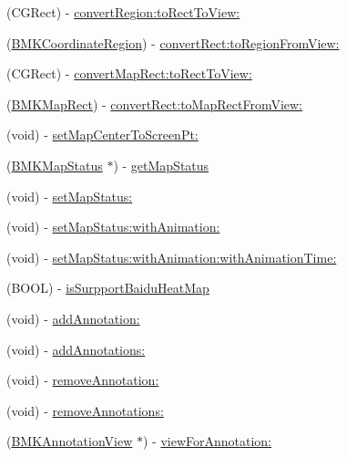 \begin{DoxyCompactItemize}
\item 
(C\+G\+Rect) -\/ \hyperlink{interface_b_m_k_map_view_a952023c2e24a13c993977d276745f329}{convert\+Region\+:to\+Rect\+To\+View\+:}
\item 
(\hyperlink{struct_b_m_k_coordinate_region}{B\+M\+K\+Coordinate\+Region}) -\/ \hyperlink{interface_b_m_k_map_view_ae99130c0eceabae6c9e202699ba375d1}{convert\+Rect\+:to\+Region\+From\+View\+:}
\item 
(C\+G\+Rect) -\/ \hyperlink{interface_b_m_k_map_view_a4a802244887690c7238bd5c8e18918ae}{convert\+Map\+Rect\+:to\+Rect\+To\+View\+:}
\item 
(\hyperlink{struct_b_m_k_map_rect}{B\+M\+K\+Map\+Rect}) -\/ \hyperlink{interface_b_m_k_map_view_afa77dab84c13620c4ce0dee46df87b46}{convert\+Rect\+:to\+Map\+Rect\+From\+View\+:}
\item 
(void) -\/ \hyperlink{interface_b_m_k_map_view_afc552204ea098d293a4f0d7ebf35b8ac}{set\+Map\+Center\+To\+Screen\+Pt\+:}
\item 
(\hyperlink{interface_b_m_k_map_status}{B\+M\+K\+Map\+Status} $\ast$) -\/ \hyperlink{interface_b_m_k_map_view_a419f8ac73742ccf9ef7fb921b349bca4}{get\+Map\+Status}
\item 
(void) -\/ \hyperlink{interface_b_m_k_map_view_a595b3baaa42f35fd5fa3b778011a59d7}{set\+Map\+Status\+:}
\item 
(void) -\/ \hyperlink{interface_b_m_k_map_view_abf8e2308ae62e367f8b1271a9918060f}{set\+Map\+Status\+:with\+Animation\+:}
\item 
(void) -\/ \hyperlink{interface_b_m_k_map_view_a9668d8aa419c7a9140c79846fabc3598}{set\+Map\+Status\+:with\+Animation\+:with\+Animation\+Time\+:}
\item 
(B\+O\+O\+L) -\/ \hyperlink{interface_b_m_k_map_view_a2256a65857b14f9cd56655663a966e14}{is\+Surpport\+Baidu\+Heat\+Map}
\item 
(void) -\/ \hyperlink{interface_b_m_k_map_view_a2af9ed45c3a7fd530dd414dc573327b3}{add\+Annotation\+:}
\item 
(void) -\/ \hyperlink{interface_b_m_k_map_view_affd032313c55ae27814430b760e4aea0}{add\+Annotations\+:}
\item 
(void) -\/ \hyperlink{interface_b_m_k_map_view_a6b6b75a5bf8b02854767f782a38d2009}{remove\+Annotation\+:}
\item 
(void) -\/ \hyperlink{interface_b_m_k_map_view_a37fbe2b5db750affb4e0234cbf24a3c7}{remove\+Annotations\+:}
\item 
(\hyperlink{interface_b_m_k_annotation_view}{B\+M\+K\+Annotation\+View} $\ast$) -\/ \hyperlink{interface_b_m_k_map_view_a0fb885234188aef28df944d5f636c70c}{view\+For\+Annotation\+:}

\end{DoxyCompactItemize}
